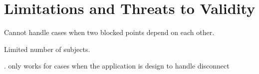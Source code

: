\section{Limitations and Threats to Validity}
\label{sec:limitations}

Cannot handle cases when two blocked points depend on each other.

Limited number of subjects.

. only works for cases when the application is design to handle disconnect
 